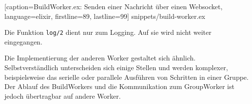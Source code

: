 
  [caption={BuildWorker.ex: Senden einer Nachricht über einen Websocket},
  language=elixir,
  firstline=89,
  lastline=99]
  {snippets/build-worker.ex}

Die Funktion \texttt{log/2} dient nur zum Logging. Auf sie wird nicht weiter eingegangen.

Die Implementierung der anderen Worker gestaltet sich ähnlich. Selbstverständlich unterscheiden sich einige Stellen und werden komplexer, beispielsweise das serielle oder parallele Ausführen von Schritten in einer Gruppe. Der Ablauf des BuildWorkers und die Kommunikation zum GroupWorker ist jedoch übertragbar auf andere Worker.
